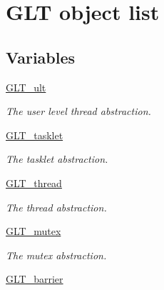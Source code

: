 \hypertarget{group__OBJECTS}{\section{G\-L\-T object list}
\label{group__OBJECTS}
}
\subsection*{Variables}
\begin{DoxyCompactItemize}
\item 
\hypertarget{group__OBJECTS_gaa560da37f581d1cbf86b736270c7d78c}{\hyperlink{group__OBJECTS_gaa560da37f581d1cbf86b736270c7d78c}{G\-L\-T\-\_\-ult}}\label{group__OBJECTS_gaa560da37f581d1cbf86b736270c7d78c}

\begin{DoxyCompactList}\small\item\em The user level thread abstraction. \end{DoxyCompactList}\item 
\hypertarget{group__OBJECTS_gaea74ef1c9247a6c3f8f9aa243ec3491c}{\hyperlink{group__OBJECTS_gaea74ef1c9247a6c3f8f9aa243ec3491c}{G\-L\-T\-\_\-tasklet}}\label{group__OBJECTS_gaea74ef1c9247a6c3f8f9aa243ec3491c}

\begin{DoxyCompactList}\small\item\em The tasklet abstraction. \end{DoxyCompactList}\item 
\hypertarget{group__OBJECTS_ga3a73b2d7eb94308fd30c7b98000d6503}{\hyperlink{group__OBJECTS_ga3a73b2d7eb94308fd30c7b98000d6503}{G\-L\-T\-\_\-thread}}\label{group__OBJECTS_ga3a73b2d7eb94308fd30c7b98000d6503}

\begin{DoxyCompactList}\small\item\em The thread abstraction. \end{DoxyCompactList}\item 
\hypertarget{group__OBJECTS_ga17fa54e8d474f0313c629c34c119f0c8}{\hyperlink{group__OBJECTS_ga17fa54e8d474f0313c629c34c119f0c8}{G\-L\-T\-\_\-mutex}}\label{group__OBJECTS_ga17fa54e8d474f0313c629c34c119f0c8}

\begin{DoxyCompactList}\small\item\em The mutex abstraction. \end{DoxyCompactList}\item 
\hypertarget{group__OBJECTS_ga80323c3be9c36c5b48c351c29e4a5a9b}{\hyperlink{group__OBJECTS_ga80323c3be9c36c5b48c351c29e4a5a9b}{G\-L\-T\-\_\-barrier}}\label{group__OBJECTS_ga80323c3be9c36c5b48c351c29e4a5a9b}


\end{DoxyCompactItemize}
